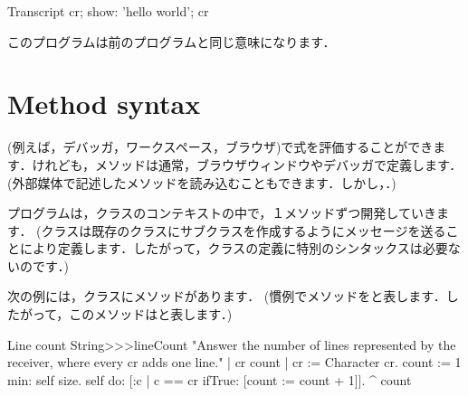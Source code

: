 \documentclass[a4paper,10pt,twoside]{book}
\begin{document}
\begin{code}{}
Transcript cr;
    show: 'hello world';
    cr
\end{code}
このプログラムは前のプログラムと同じ意味になります．

\section{Method syntax}

(例えば，デバッガ，ワークスペース，ブラウザ)で式を評価することができます．けれども，メソッドは通常，ブラウザウィンドウやデバッガで定義します．
(外部媒体で記述したメソッドを読み込むこともできます．しかし，．)

プログラムは，クラスのコンテキストの中で，１メソッドずつ開発していきます．
(クラスは既存のクラスにサブクラスを作成するようにメッセージを送ることにより定義します．したがって，クラスの定義に特別のシンタックスは必要ないのです．)

次の例には，クラスにメソッドがあります．
(慣例でメソッドをと表します．したがって，このメソッドはと表します．)

\begin{method}[lineCount]{Line count}
String>>>lineCount
   "Answer the number of lines represented by the receiver,
   where every cr adds one line."
   | cr count |
   cr := Character cr.
   count := 1 min: self size.
   self do:
      [:c | c == cr ifTrue: [count := count + 1]].
   ^ count
\end{method}
\end{document}
